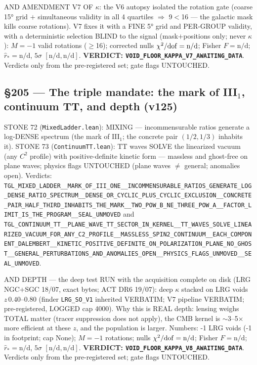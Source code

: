 \documentclass[11pt]{article}
\theoremstyle{definition}\newtheorem{deriv}{Derivation}
\begin{document}
AND AMENDMENT V7 OF $\kappa$: the V6 autopsy isolated the rotation gate (coarse 15° grid $+$ simultaneous validity in all 4 quartiles $\Rightarrow$ 9$<$16 --- the galactic mask kills coarse rotations). V7 fixes it with a FINE 5° grid and PER-GROUP validity, with a deterministic selection BLIND to the signal (mask$+$positions only; never $\kappa$): $M=-1$ valid rotations ($\geq$16); corrected nulls $\chi^2/{\rm dof}=\text{n/d}$; Fisher $F=\text{n/d}$; $\hat r_*=\text{n/d}$, $5\sigma$ $[\text{n/d},\text{n/d}]$. \textbf{VERDICT: \texttt{VOID\_FLOOR\_KAPPA\_V7\_AWAITING\_DATA}}. Verdicts only from the pre-registered set; gate flags UNTOUCHED.

\subsection*{\S205 --- The triple mandate: the mark of III$_1$, continuum TT, and depth (v125)}STONE 72 (\texttt{MixedLadder.lean}): MIXING — incommensurable ratios generate a log-DENSE spectrum (the mark of III$_1$; the concrete pair $(1/2,1/3)$ inhabits it). STONE 73 (\texttt{ContinuumTT.lean}): TT waves SOLVE the linearized vacuum (any $C^2$ profile) with positive-definite kinetic form — massless and ghost-free on plane waves; physics flags UNTOUCHED (plane waves $\neq$ general; anomalies open). Verdicts: \texttt{TGL\_MIXED\_LADDER\_\_MARK\_OF\_III\_ONE\_\_INCOMMENSURABLE\_RATIOS\_GENERATE\_LOG\_DENSE\_RATIO\_SPECTRUM\_\_DENSE\_OR\_CYCLIC\_PLUS\_CYCLIC\_EXCLUSION\_\_CONCRETE\_PAIR\_HALF\_THIRD\_INHABITS\_THE\_MARK\_\_TWO\_POW\_B\_NE\_THREE\_POW\_A\_\_FACTOR\_LIMIT\_IS\_THE\_PROGRAM\_\_SEAL\_UNMOVED} and \texttt{TGL\_CONTINUUM\_TT\_\_PLANE\_WAVE\_TT\_SECTOR\_IN\_KERNEL\_\_TT\_WAVES\_SOLVE\_LINEARIZED\_VACUUM\_FOR\_ANY\_C2\_PROFILE\_\_MASSLESS\_SPIN2\_CONTINUUM\_\_EACH\_COMPONENT\_DALEMBERT\_\_KINETIC\_POSITIVE\_DEFINITE\_ON\_POLARIZATION\_PLANE\_NO\_GHOST\_\_GENERAL\_PERTURBATIONS\_AND\_ANOMALIES\_OPEN\_\_PHYSICS\_FLAGS\_UNMOVED\_\_SEAL\_UNMOVED}.

AND DEPTH — the deep test RUN with the acquisition complete on disk (LRG NGC$+$SGC 18/07, exact bytes; ACT DR6 19/07): deep $\kappa$ stacked on LRG voids $z\,0.40$--$0.80$ (finder \texttt{LRG\_SO\_V1} inherited VERBATIM; V7 pipeline VERBATIM; pre-registered, LOGGED cap 4000). Why this is REAL depth: lensing weighs TOTAL matter (tracer suppression does not apply), the CMB kernel is $\sim$3--5$\times$ more efficient at these $z$, and the population is larger. Numbers: -1 LRG voids (-1 in footprint; cap None); $M=-1$ rotations; nulls $\chi^2/{\rm dof}=\text{n/d}$; Fisher $F=\text{n/d}$; $\hat r_*=\text{n/d}$, $5\sigma$ $[\text{n/d},\text{n/d}]$. \textbf{VERDICT: \texttt{VOID\_FLOOR\_KAPPA\_V8\_AWAITING\_DATA}}. Verdicts only from the pre-registered set; gate flags UNTOUCHED.
\end{document}
